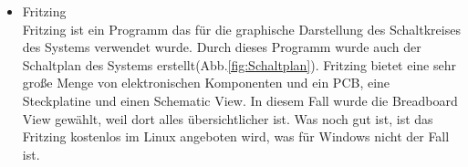 \begin{itemize}
		\item Fritzing \\
		Fritzing ist ein Programm das für die graphische Darstellung des Schaltkreises des Systems verwendet wurde. Durch dieses Programm wurde auch der Schaltplan des Systems erstellt(Abb.\ref{fig:Schaltplan}). Fritzing bietet eine sehr große Menge von elektronischen Komponenten und ein PCB, eine Steckplatine und einen Schematic View. In diesem Fall wurde die Breadboard View gewählt, weil dort alles übersichtlicher ist. Was noch gut ist, ist das Fritzing kostenlos im Linux angeboten wird, was für Windows nicht der Fall ist.
\end{itemize}	
	
